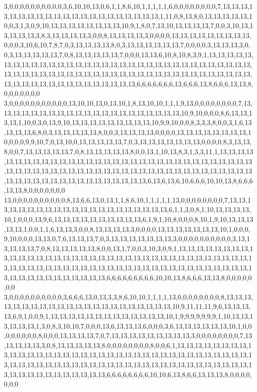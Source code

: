 3,0,0,0,0,0,0,0,0,0,0,3,6,10,10,13,0,6,1,1,8,6,10,1,1,1,1,1,6,0,0,0,0,0,0,0,0,7,13,13,13,13,13,13,13,13,13,13,13,13,13,13,13,13,13,13,13,13,13,1,11,0,8,13,8,0,13,13,13,13,13,10,0,3,1,3,0,9,10,13,13,13,13,13,13,13,13,10,9,1,8,0,7,13,10,13,13,13,13,7,0,0,3,10,13,13,13,13,13,3,8,3,13,13,13,13,3,0,0,8,13,13,13,13,3,0,0,0,0,13,13,13,13,13,13,13,13,13,0,0,0,3,10,6,10,7,8,7,0,3,13,13,13,13,8,0,3,13,13,13,13,13,13,7,0,0,0,0,3,13,13,13,3,0,0,3,13,13,13,13,13,7,0,8,13,13,13,13,13,7,0,0,0,13,13,6,10,8,10,8,3,9,1,13,13,13,13,13,13,13,13,13,13,13,13,13,13,13,13,13,13,13,13,13,13,13,13,13,13,13,13,13,13,13,13,13,13,13,13,13,13,13,13,13,13,13,13,13,13,13,13,13,13,13,13,13,13,13,13,13,13,13,13,13,13,13,13,13,13,13,13,13,13,13,13,13,13,13,13,6,6,6,6,6,6,6,13,6,6,6,13,8,6,6,6,13,13,8,0,0,0,0,0,0,0
3,0,0,0,0,0,0,0,0,0,0,0,13,10,10,13,0,13,10,1,8,13,10,10,1,1,1,9,13,0,0,0,0,0,0,0,0,7,13,13,13,13,13,13,13,13,13,13,13,13,13,13,13,13,13,13,13,13,13,10,9,10,0,0,0,8,6,13,13,13,13,1,10,0,3,0,13,9,10,13,13,13,13,13,13,13,13,13,10,9,9,10,0,0,8,3,3,3,8,0,0,3,1,6,13,13,13,13,6,8,0,3,13,13,13,13,13,8,0,0,3,13,13,13,13,0,0,0,0,13,13,13,13,13,13,13,13,10,0,0,0,9,9,10,7,0,13,10,0,13,13,13,13,13,7,0,3,13,13,13,13,13,13,13,0,0,0,0,8,3,13,13,8,0,0,7,13,13,13,13,13,7,0,8,13,13,13,13,13,8,0,0,13,1,10,13,8,3,1,3,3,11,1,13,13,13,13,13,13,13,13,13,13,13,13,13,13,13,13,13,13,13,13,13,13,13,13,13,13,13,13,13,13,13,13,13,13,13,13,13,13,13,13,13,13,13,13,13,13,13,13,13,13,13,13,13,13,13,13,13,13,13,13,13,13,13,13,13,13,13,13,13,13,13,13,13,13,13,13,6,13,6,13,6,10,6,6,6,10,10,13,8,6,6,6,13,13,8,0,0,0,0,0,0,0
13,0,0,0,0,0,0,0,0,0,0,8,13,6,6,13,0,13,1,1,8,6,10,1,1,1,1,1,13,0,0,0,0,0,0,0,0,7,13,13,13,13,13,13,13,13,13,13,13,13,13,13,13,13,13,13,13,13,13,6,1,1,3,0,8,1,10,13,13,13,13,10,1,0,0,0,13,9,6,13,13,13,13,13,13,13,13,13,13,6,1,9,1,10,8,0,0,0,8,10,1,9,10,13,13,13,13,13,1,0,0,1,1,6,13,13,3,0,0,8,13,13,13,13,3,0,0,0,0,13,13,13,13,13,13,13,10,1,0,0,0,9,10,0,0,0,13,13,0,7,6,13,13,13,7,0,3,13,13,13,13,13,13,13,3,0,0,0,0,0,0,0,0,0,0,3,13,13,13,13,13,7,0,8,13,13,13,13,13,8,0,0,13,1,7,0,0,3,10,3,0,9,1,13,13,13,13,13,13,13,13,13,13,13,13,13,13,13,13,13,13,13,13,13,13,13,13,13,13,13,13,13,13,13,13,13,13,13,13,13,13,13,13,13,13,13,13,13,13,13,13,13,13,13,13,13,13,13,13,13,13,13,13,13,13,13,13,13,13,13,13,13,13,13,13,13,13,13,13,6,6,6,6,6,6,6,6,6,10,10,13,8,6,6,6,13,13,8,0,0,0,0,0,0,0
3,0,0,0,0,0,0,0,0,0,0,3,6,6,6,13,0,13,3,3,8,6,10,10,1,1,1,1,13,0,0,0,0,0,0,0,0,8,13,13,13,13,13,13,13,13,13,13,13,13,13,13,13,13,13,13,13,13,13,13,10,9,11,11,11,9,6,13,13,13,13,6,9,1,0,0,9,1,13,13,13,13,13,13,13,13,13,13,13,13,13,10,1,9,9,9,9,9,9,9,1,10,13,13,13,13,13,13,1,3,0,8,3,10,10,7,0,0,0,13,6,13,13,13,6,0,0,0,3,6,13,13,13,13,13,13,10,1,0,0,0,0,0,0,0,0,8,0,0,0,13,13,13,13,7,0,7,13,13,13,13,13,13,13,13,13,3,0,0,0,0,0,0,0,0,7,13,13,13,13,13,3,0,8,13,13,13,13,13,8,0,0,0,0,0,0,0,0,8,0,0,6,1,13,13,13,13,13,13,13,13,13,13,13,13,13,13,13,13,13,13,13,13,13,13,13,13,13,13,13,13,13,13,13,13,13,13,13,13,13,13,13,13,13,13,13,13,13,13,13,13,13,13,13,13,13,13,13,13,13,13,13,13,13,13,13,13,13,13,13,13,13,13,13,13,13,13,13,13,6,6,6,6,6,6,6,6,10,10,6,13,8,6,6,13,13,13,8,0,0,0,0,0,0,0
